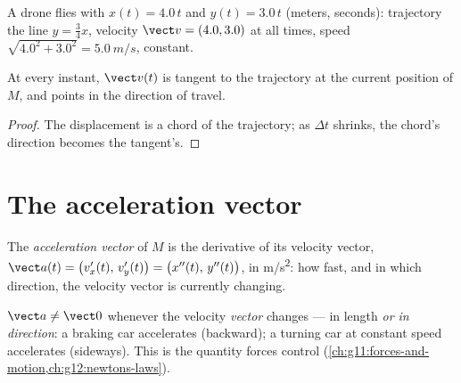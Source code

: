 \begin{example}\label{ex:g12:kinematics-2d:drone}
A drone flies with $x(t) = 4.0\,t$ and $y(t) = 3.0\,t$ (meters,
seconds): trajectory the line $y = \tfrac34 x$, velocity
$\vect v = (4.0, 3.0)$ at all times, speed
$\sqrt{4.0^2 + 3.0^2} = \qty{5.0}{m/s}$, constant.
\end{example}

\begin{proposition}\label{prop:g12:kinematics-2d:tangent}
At every instant, $\vect v(t)$ is tangent to the trajectory at the
current position of $M$, and points in the direction of travel.
\end{proposition}

\begin{proof}
The displacement is a chord of the trajectory; as $\Delta t$ shrinks,
the chord's direction becomes the tangent's.
\end{proof}

\section{The acceleration vector}

\begin{definition}\label{def:g12:kinematics-2d:acceleration}
The \emph{acceleration vector} of $M$ is
the derivative of its velocity vector,
$\vect a(t) = \bigl(v_x'(t),\, v_y'(t)\bigr) =
\bigl(x''(t),\, y''(t)\bigr)$, in \unit{m/s^2}: how fast, and in
which direction, the velocity vector is currently changing.
\end{definition}

\begin{remark}\label{rem:g12:kinematics-2d:turning}
$\vect a \neq \vect 0$ whenever the velocity \emph{vector} changes
--- in length \emph{or in direction}: a braking car accelerates
(backward); a turning car at constant speed accelerates (sideways).
This is the quantity forces control
(\cref{ch:g11:forces-and-motion,ch:g12:newtons-laws}).
\end{remark}

